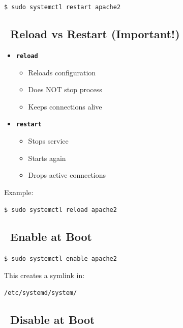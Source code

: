 \documentclass[12pt]{article}
\begin{document}
\begin{highlightbox}
\texttt{\$ sudo systemctl restart apache2}
\end{highlightbox}

\subsection*{\faSync\ Reload vs Restart (Important!)}

\begin{itemize}
    \item \textbf{\texttt{reload}}
    \begin{itemize}
        \item Reloads configuration
        \item Does NOT stop process
        \item Keeps connections alive
    \end{itemize}
    
    \item \textbf{\texttt{restart}}
    \begin{itemize}
        \item Stops service
        \item Starts again
        \item Drops active connections
    \end{itemize}
\end{itemize}

Example:

\begin{highlightbox}
\texttt{\$ sudo systemctl reload apache2}
\end{highlightbox}

\subsection*{\faPowerOff\ Enable at Boot}

\begin{highlightbox}
\texttt{\$ sudo systemctl enable apache2}
\end{highlightbox}

This creates a symlink in:

\begin{highlightbox}
\texttt{/etc/systemd/system/}
\end{highlightbox}

\subsection*{\faBan\ Disable at Boot}
\end{document}
